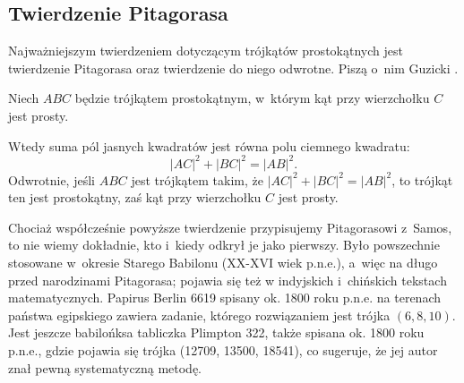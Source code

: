 %

\subsection{Twierdzenie Pitagorasa}
Najważniejszym twierdzeniem dotyczącym trójkątów prostokątnych jest twierdzenie Pitagorasa oraz twierdzenie do niego odwrotne.
Piszą o~nim Guzicki \cite[s. 160]{guzicki_2021}.


\begin{theorem}[Pitagorasa]
%
\label{theorem_pythagorean}%
    Niech $ABC$ będzie trójkątem prostokątnym, w~którym kąt przy wierzchołku $C$ jest prosty.
    \begin{center}
\begin{comment}
        \begin{tikzpicture}[scale=.4]
        \tkzDefPoint(105:3){A}
        \tkzDefPoint(285:3){B}
        \tkzDefPoint(35:3){C}
        \tkzDefPoint(35:4.75){CC}
        \tkzMarkRightAngle[size=0.5](A,C,B)

        \tkzLabelPoint[above left](A){$A$}
        \tkzLabelPoint[below](B){$B$}
        \tkzLabelPoint[below left](CC){$C$}
        \tkzDefSquare(B,A)
        \tkzDrawPolygon[fill=black!50](B,A,tkzFirstPointResult, tkzSecondPointResult)
        \tkzDefSquare(C,B)
        \tkzDrawPolygon[fill=black!25](C,B,tkzFirstPointResult, tkzSecondPointResult)
        \tkzDefSquare(A,C)
        \tkzDrawPolygon[fill=black!25](A,C,tkzFirstPointResult, tkzSecondPointResult)
        \tkzDrawPolygon[line width=0.4mm](A,B,C)
    \end{tikzpicture}
\end{comment}
    \end{center}
    Wtedy suma pól jasnych kwadratów jest równa polu ciemnego kwadratu:
    \begin{equation}
        |AC|^2 + |BC|^2 = |AB|^2.
    \end{equation}
    Odwrotnie, jeśli $ABC$ jest trójkątem takim, że $|AC|^2 + |BC|^2 = |AB|^2$, to trójkąt ten jest prostokątny, zaś kąt przy wierzchołku $C$ jest prosty.
\end{theorem}

Chociaż współcześnie powyższe twierdzenie przypisujemy Pitagorasowi z~Samos, to nie wiemy dokładnie, kto i~kiedy odkrył je jako pierwszy.
%
Było powszechnie stosowane w~okresie Starego Babilonu (XX-XVI wiek p.n.e.), a~więc na długo przed narodzinami Pitagorasa; pojawia się też w indyjskich i~chińskich tekstach matematycznych.
Papirus Berlin 6619 spisany ok. 1800 roku p.n.e. na terenach państwa egipskiego zawiera zadanie, którego rozwiązaniem jest trójka $(6, 8, 10)$.
Jest jeszcze babilońksa tabliczka Plimpton 322, także spisana ok. 1800 roku p.n.e., gdzie pojawia się trójka (12709, 13500, 18541), co sugeruje, że jej autor znał pewną systematyczną metodę.

